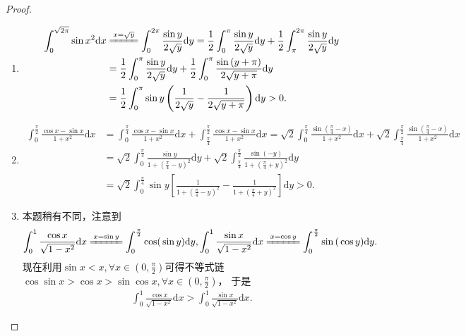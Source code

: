 \documentclass[../../main.tex]{subfiles}%
\begin{document}
\begin{proof}
\begin{enumerate}
\item \begin{align*}
\int_0^{\sqrt{2\pi}}{\sin x^2\mathrm{d}x}&\xlongequal{x=\sqrt{y}}\int_0^{2\pi}{\frac{\sin y}{2\sqrt{y}}\mathrm{d}y}=\frac{1}{2}\int_0^{\pi}{\frac{\sin y}{2\sqrt{y}}\mathrm{d}y}+\frac{1}{2}\int_{\pi}^{2\pi}{\frac{\sin y}{2\sqrt{y}}\mathrm{d}y}
\\
&=\frac{1}{2}\int_0^{\pi}{\frac{\sin y}{2\sqrt{y}}\mathrm{d}y}+\frac{1}{2}\int_0^{\pi}{\frac{\sin \left( y+\pi \right)}{2\sqrt{y+\pi}}\mathrm{d}y}
\\
&=\frac{1}{2}\int_0^{\pi}{\sin y\left( \frac{1}{2\sqrt{y}}-\frac{1}{2\sqrt{y+\pi}} \right) \mathrm{d}y}>0.
\end{align*}

\item \begin{align*}
\int_0^{\frac{\pi}{2}}{\frac{\cos x-\sin x}{1+x^2}\mathrm{d}x}&=\int_0^{\frac{\pi}{4}}{\frac{\cos x-\sin x}{1+x^2}\mathrm{d}x}+\int_{\frac{\pi}{4}}^{\frac{\pi}{2}}{\frac{\cos x-\sin x}{1+x^2}\mathrm{d}x}=\sqrt{2}\int_0^{\frac{\pi}{4}}{\frac{\sin \left( \frac{\pi}{4}-x \right)}{1+x^2}\mathrm{d}x}+\sqrt{2}\int_{\frac{\pi}{4}}^{\frac{\pi}{2}}{\frac{\sin \left( \frac{\pi}{4}-x \right)}{1+x^2}\mathrm{d}x}
\\
&=\sqrt{2}\int_0^{\frac{\pi}{4}}{\frac{\sin y}{1+\left( \frac{\pi}{4}-y \right) ^2}\mathrm{d}y}+\sqrt{2}\int_{\frac{\pi}{4}}^{\frac{\pi}{2}}{\frac{\sin \left( -y \right)}{1+\left( \frac{\pi}{4}+y \right) ^2}\mathrm{d}y}
\\
&=\sqrt{2}\int_0^{\frac{\pi}{4}}{\sin y\left[ \frac{1}{1+\left( \frac{\pi}{4}-y \right) ^2}-\frac{1}{1+\left( \frac{\pi}{4}+y \right) ^2} \right] \mathrm{d}y}>0.
\end{align*}

\item 本题稍有不同，注意到
\begin{align*}
\int_0^1{\frac{\cos x}{\sqrt{1-x^2}}\mathrm{d}x\xlongequal{x=\sin y}\int_0^{\frac{\pi}{2}}{\mathrm{cos(}\sin y)\mathrm{d}y,\int_0^1{\frac{\sin x}{\sqrt{1-x^2}}\mathrm{d}x\xlongequal{x=\cos y}\int_0^{\frac{\pi}{2}}{\sin\mathrm{(}\cos y)\mathrm{d}y}}}}.
\end{align*}
现在利用\(\sin x < x, \forall x \in (0, \frac{\pi}{2})\)可得不等式链
\(\cos\sin x > \cos x > \sin\cos x, \forall x \in (0, \frac{\pi}{2})\)，
于是
\begin{align*}
\int_{0}^{1}\frac{\cos x}{\sqrt{1 - x^{2}}}\mathrm{d}x > \int_{0}^{1}\frac{\sin x}{\sqrt{1 - x^{2}}}\mathrm{d}x.
\end{align*} 
\end{enumerate}

\end{proof}
\end{document}
